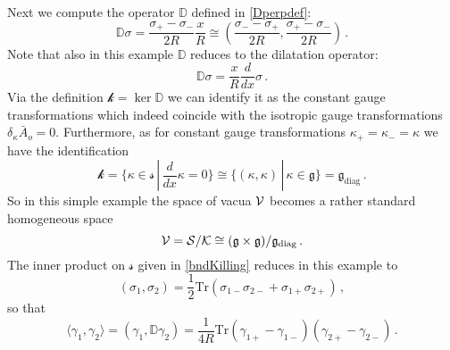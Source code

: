 \documentclass[11pt,a4paper]{article}
\def\calk{{\cal K}}
\def\calsk{\boldsymbol{\mathscr k}}
\def\cals{{\cal S}}
\def\calss{{\boldsymbol{\mathscr s}}}
\def\calv{{\cal V}}
\def\Tr{\mathrm{Tr}}
\def\Dperp{{\mathbb{D}}}
\begin{document}
   Next we compute the operator $\Dperp$ defined in \eqref{Dperpdef}:
    \begin{equation}
    \Dperp\sigma=\frac{\sigma_+-\sigma_-}{2R}\frac{x}{R}\cong \left(\frac{\sigma_--\sigma_+}{2R},\frac{\sigma_+-\sigma_-}{2R}\right)  \,.
    \end{equation}
   Note that  also in this example $\Dperp$ reduces to the dilatation operator:
    \begin{equation}
    \Dperp\sigma=\frac{x}{R}\frac{d}{dx}\sigma  \,.
    \end{equation}
    Via the definition $\calsk=\ker \Dperp$  we can identify it as the constant gauge transformations which indeed coincide with the isotropic gauge transformations $\delta_\kappa\bar A_o=0$. Furthermore, as for constant gauge transformations $\kappa_+=\kappa_-=\kappa$ we have the identification
    \begin{equation}
    \calsk=\{\kappa\in\calss\,|\, \frac{d}{dx}\kappa=0\}\cong\{(\kappa,\kappa)\,|\, \kappa\in \mathfrak{g}\}=\mathfrak{g}_\mathrm{diag}  \,.
    \end{equation}
    So in this simple example the space of vacua $\calv$ becomes a rather standard homogeneous space
    \begin{equation}
    \calv=\cals/\calk\cong(\mathfrak{g}\times\mathfrak{g})/\mathfrak{g}_\mathrm{diag}  \,.
    \end{equation}
    The inner product on $\calss$ given in \eqref{bndKilling} reduces in this example to
    \begin{equation}
    (\sigma_1,\sigma_2)=\frac{1}{2}\Tr (\sigma_{1-}\sigma_{2-}+\sigma_{1+}\sigma_{2+})    \,,
    \end{equation}
    so that
    \begin{equation}
    \langle \gamma_1,\gamma_2\rangle=(\gamma_1,\Dperp \gamma_2)=\frac{1}{4R}\Tr (\gamma_{1+}-\gamma_{1-})(\gamma_{2+}-\gamma_{2-})\,.
    \end{equation}
    
\end{document}
